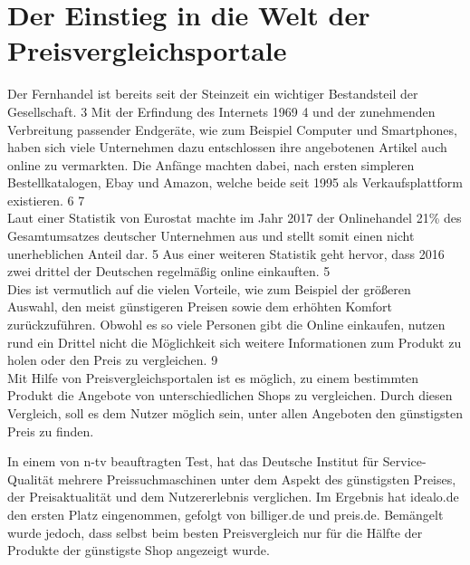 \section{Der Einstieg in die Welt der Preisvergleichsportale}


Der Fernhandel ist bereits seit der Steinzeit ein wichtiger Bestandsteil der Gesellschaft. 3
Mit der Erfindung des Internets 1969 4 und der zunehmenden Verbreitung passender Endgeräte, wie zum Beispiel Computer und Smartphones, haben sich viele Unternehmen dazu entschlossen ihre angebotenen Artikel auch online zu vermarkten. Die Anfänge machten dabei, nach ersten simpleren Bestellkatalogen, Ebay und Amazon, welche beide seit 1995 als Verkaufsplattform existieren. 6 7\\
Laut einer Statistik von Eurostat machte im Jahr 2017 der Onlinehandel 21\% des Gesamtumsatzes deutscher Unternehmen aus und stellt somit einen nicht unerheblichen Anteil dar. 5 
Aus einer weiteren Statistik geht hervor, dass 2016 zwei drittel der Deutschen regelmäßig online einkauften. 5\\
Dies ist vermutlich auf die vielen Vorteile, wie zum Beispiel der größeren Auswahl, den meist günstigeren Preisen sowie dem erhöhten Komfort zurückzuführen.
Obwohl es so viele Personen gibt die Online einkaufen, nutzen rund ein Drittel nicht die Möglichkeit sich weitere Informationen zum Produkt zu holen oder den Preis zu vergleichen. 9\\
Mit Hilfe von Preisvergleichsportalen ist es möglich, zu einem bestimmten Produkt die Angebote von unterschiedlichen Shops zu vergleichen. Durch diesen Vergleich, soll es dem Nutzer möglich sein, unter allen Angeboten den günstigsten Preis zu finden.

In einem von n-tv beauftragten Test, hat das Deutsche Institut für Service-Qualität mehrere Preissuchmaschinen unter dem Aspekt des günstigsten Preises, der Preisaktualität und dem Nutzererlebnis verglichen. Im Ergebnis hat idealo.de den ersten Platz eingenommen, gefolgt von billiger.de und preis.de.
Bemängelt wurde jedoch, dass selbst beim besten Preisvergleich nur für die Hälfte der Produkte der günstigste Shop angezeigt wurde.

